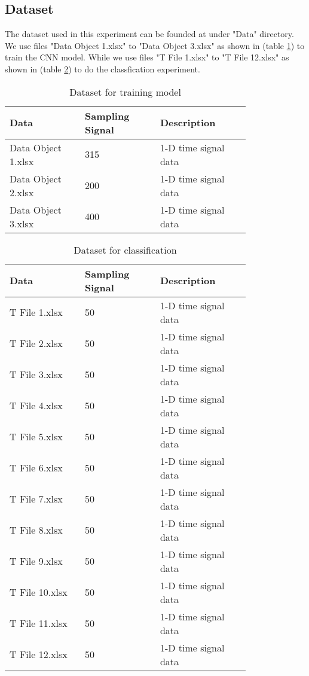 \documentclass[conference]{IEEEtran}
\begin{document}
\subsection{Dataset}
The dataset used in this experiment can be founded at \cite{b4} under "Data" directory. We use files "Data Object 1.xlsx" to "Data Object 3.xlsx" as shown in (table \ref{table_traindata}) to train the CNN model. While we use files "T File 1.xlsx" to "T File 12.xlsx" as shown in (table \ref{table_classifydata}) to do the classfication experiment. 

\begin{table}[htbp]
\centering
\caption{Dataset for training model}
\begin{tabularx}{0.48\textwidth}{p{0.25\linewidth} | p{0.25\linewidth} | p{0.3\linewidth}}
\hline
Data    & Sampling Signal & Description\\
\hline
Data Object 1.xlsx  &315 & 1-D time signal data\\
Data Object 2.xlsx  &200 & 1-D time signal data\\
Data Object 3.xlsx  &400 & 1-D time signal data\\
\hline
\end{tabularx}
\label{table_traindata}
\end{table}

\begin{table}[!htbp]
\centering
\caption{Dataset for classification}
\begin{tabularx}{0.48\textwidth}{p{0.25\linewidth} | p{0.25\linewidth} | p{0.3\linewidth}}
\hline
Data    & Sampling Signal & Description\\
\hline
T File 1.xlsx  &50 & 1-D time signal data\\
T File 2.xlsx  &50 & 1-D time signal data\\
T File 3.xlsx  &50 & 1-D time signal data\\
T File 4.xlsx  &50 & 1-D time signal data\\
T File 5.xlsx  &50 & 1-D time signal data\\
T File 6.xlsx  &50 & 1-D time signal data\\
T File 7.xlsx  &50 & 1-D time signal data\\
T File 8.xlsx  &50 & 1-D time signal data\\
T File 9.xlsx  &50 & 1-D time signal data\\
T File 10.xlsx  &50 & 1-D time signal data\\
T File 11.xlsx  &50 & 1-D time signal data\\
T File 12.xlsx  &50 & 1-D time signal data\\
\hline
\end{tabularx}
\label{table_classifydata}
\end{table}
\end{document}
